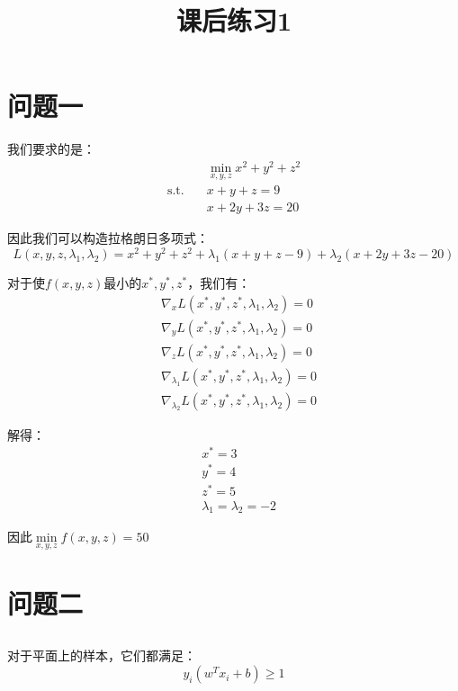 \documentclass[12pt, a4paper]{article}
\title{课后练习1}
\author{}
\date{}
\begin{document}
\maketitle %

\section{问题一}

我们要求的是：
\begin{align*}
    &\mathop{min}\limits_{x,y,z}x^2+y^2+z^2\\
    \text{s.t.} \quad & x+y+z=9\\
    &x+2y+3z=20
\end{align*}

因此我们可以构造拉格朗日多项式：
\begin{equation*}
    L(x,y,z,\lambda_1,\lambda_2)=x^2+y^2+z^2 + \lambda_1(x+y+z-9) + \lambda_2(x+2y+3z-20)
\end{equation*}

对于使$f(x,y,z)$最小的$x^*,y^*,z^*$，我们有：
\begin{align*}
    &\nabla_x L(x^*,y^*,z^*,\lambda_1,\lambda_2)=0\\
    &\nabla_y L(x^*,y^*,z^*,\lambda_1,\lambda_2)=0\\
    &\nabla_z L(x^*,y^*,z^*,\lambda_1,\lambda_2)=0\\
    &\nabla_{\lambda_1} L(x^*,y^*,z^*,\lambda_1,\lambda_2)=0\\
    &\nabla_{\lambda_2} L(x^*,y^*,z^*,\lambda_1,\lambda_2)=0
\end{align*}

解得：
\begin{align*}
    &x^*=3\\
    &y^*=4\\
    &z^*=5\\
    &\lambda_1=\lambda_2=-2
\end{align*}

因此$\mathop{min}\limits_{x,y,z}f(x,y,z)=50$


\section{问题二}


\subsection{}

对于平面上的样本，它们都满足：
\begin{equation*}
    y_i(w^T x_i+b)\geq 1
\end{equation*}
\end{document}
